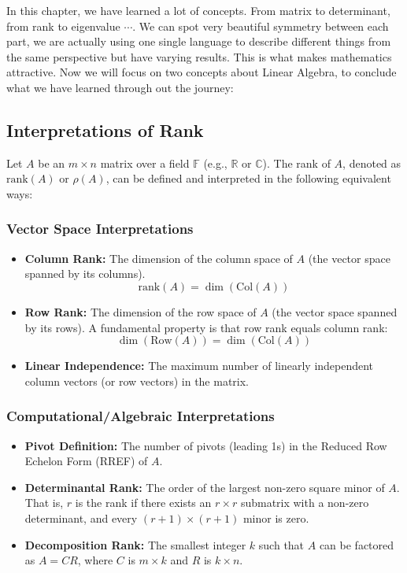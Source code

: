 In this chapter, we have learned a lot of concepts. From matrix to determinant, from rank to eigenvalue $\cdots$. We can spot very beautiful symmetry between each part, we are actually using one single language to describe different things from the same perspective but have varying results. This is what makes mathematics attractive. Now we will focus on two concepts about Linear Algebra, to conclude what we have learned through out the journey:

\subsection{Interpretations of Rank}

Let $A$ be an $m \times n$ matrix over a field $\mathbb{F}$ (e.g., $\mathbb{R}$ or $\mathbb{C}$). The rank of $A$, denoted as $\text{rank}(A)$ or $\rho(A)$, can be defined and interpreted in the following equivalent ways:

\subsubsection{Vector Space Interpretations}
\begin{itemize}
    \item \textbf{Column Rank:} The dimension of the column space of $A$ (the vector space spanned by its columns).
    \[ \text{rank}(A) = \dim(\text{Col}(A)) \]
    \item \textbf{Row Rank:} The dimension of the row space of $A$ (the vector space spanned by its rows). A fundamental property is that row rank equals column rank:
    \[ \dim(\text{Row}(A)) = \dim(\text{Col}(A)) \]
    \item \textbf{Linear Independence:} The maximum number of linearly independent column vectors (or row vectors) in the matrix.
\end{itemize}

\subsubsection{Computational/Algebraic Interpretations}
\begin{itemize}
    \item \textbf{Pivot Definition:} The number of pivots (leading 1s) in the Reduced Row Echelon Form (RREF) of $A$.
    \item \textbf{Determinantal Rank:} The order of the largest non-zero square minor of $A$. That is, $r$ is the rank if there exists an $r \times r$ submatrix with a non-zero determinant, and every $(r+1) \times (r+1)$ minor is zero.
    \item \textbf{Decomposition Rank:} The smallest integer $k$ such that $A$ can be factored as $A = CR$, where $C$ is $m \times k$ and $R$ is $k \times n$.
\end{itemize}

